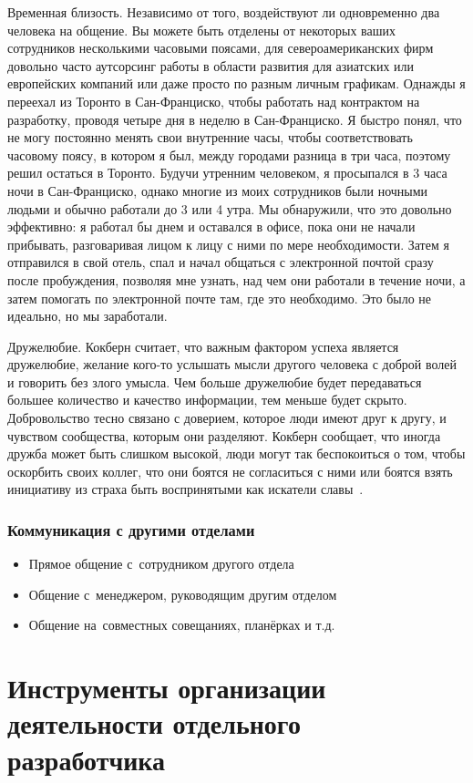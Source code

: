 \documentclass{../industrial-development}
\begin{document}
Временная близость. Независимо от того, воздействуют ли одновременно два человека на общение. Вы можете быть отделены от некоторых ваших сотрудников несколькими часовыми поясами, для североамериканских фирм довольно часто аутсорсинг работы в области развития для азиатских или европейских компаний или даже просто по разным личным графикам. Однажды я переехал из Торонто в Сан-Франциско, чтобы работать над контрактом на разработку, проводя четыре дня в неделю в Сан-Франциско. Я быстро понял, что не могу постоянно менять свои внутренние часы, чтобы соответствовать часовому поясу, в котором я был, между городами разница в три часа, поэтому решил остаться в Торонто. Будучи утренним человеком, я просыпался в 3 часа ночи в Сан-Франциско, однако многие из моих сотрудников были ночными людьми и обычно работали до 3 или 4 утра. Мы обнаружили, что это довольно эффективно: я работал бы днем ​​и оставался в офисе, пока они не начали прибывать, разговаривая лицом к лицу с ними по мере необходимости. Затем я отправился в свой отель, спал и начал общаться с электронной почтой сразу после пробуждения, позволяя мне узнать, над чем они работали в течение ночи, а затем помогать по электронной почте там, где это необходимо. Это было не идеально, но мы заработали.

Дружелюбие. Кокберн считает, что важным фактором успеха является дружелюбие, желание кого-то услышать мысли другого человека с доброй волей и говорить без злого умысла. Чем больше дружелюбие будет передаваться большее количество и качество информации, тем меньше будет скрыто. Добровольство тесно связано с доверием, которое люди имеют друг к другу, и чувством сообщества, которым они разделяют. Кокберн сообщает, что иногда дружба может быть слишком высокой, люди могут так беспокоиться о том, чтобы оскорбить своих коллег, что они боятся не согласиться с ними или боятся взять инициативу из страха быть воспринятыми как искатели славы~\cite{AgileComm}.

\begin{frame} \frametitle{Коммуникация с другими отделами}
  \begin{itemize}
  \item Прямое общение с~сотрудником другого отдела
  \item Общение с~менеджером, руководящим другим отделом
  \item Общение на~совместных совещаниях, планёрках и т.д.
  \end{itemize}
\end{frame}

\section{Инструменты организации деятельности отдельного разработчика}
\end{document}
